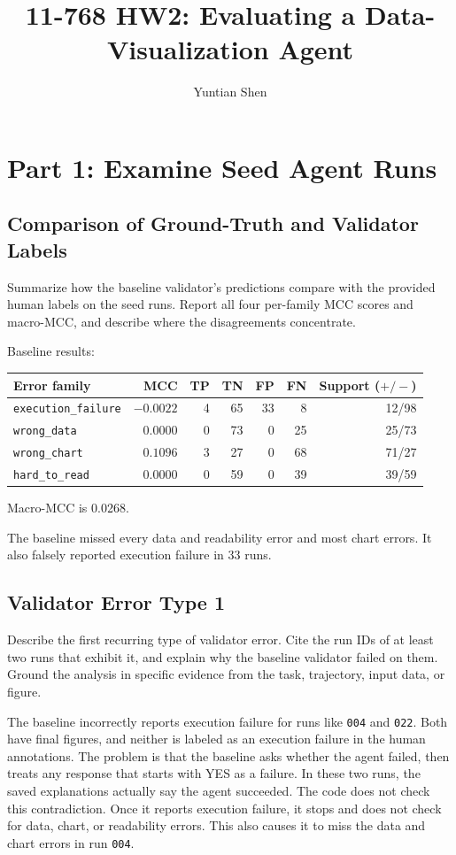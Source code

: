 \documentclass[11pt]{article}
\title{11-768 HW2: Evaluating a Data-Visualization Agent}
\author{Yuntian Shen}
\date{}
\begin{document}
\maketitle

\section{Part 1: Examine Seed Agent Runs}

\subsection{Comparison of Ground-Truth and Validator Labels}
Summarize how the baseline validator's predictions compare with the provided
human labels on the seed runs. Report all four per-family MCC scores and macro-MCC, and describe
where the disagreements concentrate.

\medskip
Baseline results:
\begin{center}
\begin{tabular}{lrrrrrr}
\toprule
Error family & MCC & TP & TN & FP & FN & Support ($+/-$) \\
\midrule
\texttt{execution\_failure} & $-0.0022$ & 4 & 65 & 33 & 8 & 12/98 \\
\texttt{wrong\_data} & $0.0000$ & 0 & 73 & 0 & 25 & 25/73 \\
\texttt{wrong\_chart} & $0.1096$ & 3 & 27 & 0 & 68 & 71/27 \\
\texttt{hard\_to\_read} & $0.0000$ & 0 & 59 & 0 & 39 & 39/59 \\
\bottomrule
\end{tabular}
\end{center}

Macro-MCC is 0.0268.

The baseline missed every data and readability error
and most chart errors. It also falsely reported execution failure in 33 runs.

\subsection{Validator Error Type 1}
Describe the first recurring type of validator error. Cite the run IDs of at
least two runs that exhibit it, and explain why the baseline validator failed
on them. Ground the analysis in specific evidence from the task, trajectory,
input data, or figure.

\medskip
The baseline incorrectly reports execution failure for runs like \texttt{004}
and \texttt{022}. Both have final figures, and neither is labeled as an
execution failure in the human annotations. The problem is that the
baseline asks whether the agent failed, then treats any response that
starts with YES as a failure. In these two runs, the saved explanations
actually say the agent succeeded. The code does not check this
contradiction. Once it reports execution failure, it stops and does not
check for data, chart, or readability errors. This also causes it to
miss the data and chart errors in run \texttt{004}.
\end{document}
